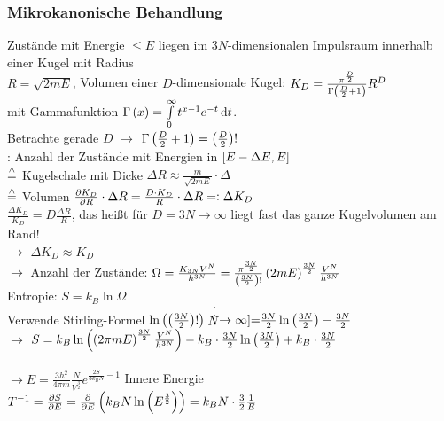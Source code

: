 \subsubsection{Mikrokanonische Behandlung}
\label{sec:Mikbeh}
\begin{tabbing}
Zustände mit Energie $\leq E$ liegen im $3N$-dimensionalen Impulsraum innerhalb einer Kugel mit Radius\\
$R = \sqrt{2 m E}$, Volumen einer $D$-dimensionale Kugel: $K_D = \frac{\pi^{\frac{D}{2}}}{\Gamma\left( \frac{D}{2} + 1 \right)} R^D$\\
mit Gammafunktion $\Gamma\left( x \right) = \int\limits_0^\infty t^{x-1} e^{-t} \,\text d{t}$.\\ Betrachte gerade $D$ $\rightarrow$ $\Gamma\left( \frac{D}{2} + 1 \right) = \left( \frac{D}{2} \right)!$\\
: \= Anzahl der Zustände mit Energien in $\left[ E-\Delta E, E \right]$\\
\> $\stackrel{\wedge}{=}$ Kugelschale mit Dicke $\Delta R \approx \frac{m}{\sqrt{2 m E}}\cdot \Delta$\\
\> $\stackrel{\wedge}{=}$ Volumen $\frac{\partial K_D}{\partial R}\cdot \Delta R = \frac{D\cdot K_D}{R}\cdot \Delta R = \vcentcolon \Delta K_D$\\
\> $\frac{\Delta K_D}{K_D} = D \frac{\Delta R}{R}$, das heißt für $D = 3N \to \infty$ liegt fast das ganze Kugelvolumen am Rand!\\
$\rightarrow$\> $\Delta K_D \approx K_D$\\
$\rightarrow$\> Anzahl der Zustände: $\Omega = \frac{K_{3N}V^N}{h^{3N}} = \frac{\pi^{\frac{3N}{2}}}{\left( \frac{3N}{2} \right)!} \left( 2 m E \right)^{\frac{3 N}{2}}\frac{V^N}{h^{3N}}$\\
Entropie: $S = k_B \ln \Omega$\\
Verwende Stirling-Formel $\ln\left( \left( \frac{3N}{2} \right)! \right) \stackrel[N\to\infty]{}{=} \frac{3N}{2} \ln\left( \frac{3N}{2} \right) - \frac{3N}{2}$\\
$\rightarrow$\> $S = k_B \ln\left( \left( 2\pi m E \right)^{\frac{3 N}{2}}\frac{V^N}{h^{3N}} \right) - k_B \cdot \frac{3N}{2} \ln\left( \frac{3 N}{2} \right) + k_B \cdot\frac{3N}{2}$\\
\> \\
$\rightarrow$\>$E = \frac{3h^2}{4\pi m} \frac{N}{V^{\frac32}} e^{\frac{2 S}{3 k_B N} - 1}$ Innere Energie\\
$T^{-1} = \frac{\partial S}{\partial E} = \frac{\partial }{\partial E}\left( k_B N \ln\left( E^{\frac32} \right) \right) = k_B N \cdot \frac32 \frac{1}{E}$\\

\end{tabbing}
